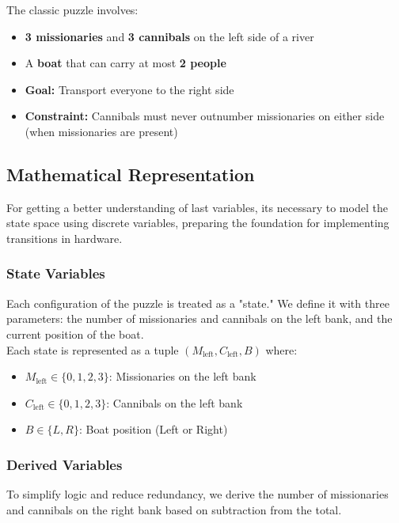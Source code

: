\documentclass[10pt,a4paper]{article}
\begin{document}
\noindent The classic puzzle involves:
\begin{itemize}
    \item \textbf{3 missionaries} and \textbf{3 cannibals} on the left side of a river
    \item A \textbf{boat} that can carry at most \textbf{2 people}
    \item \textbf{Goal:} Transport everyone to the right side
    \item \textbf{Constraint:} Cannibals must never outnumber missionaries on either side (when missionaries are present)
\end{itemize}

\subsection*{Mathematical Representation}

For getting a better understanding of last variables, its necessary to model the state space using discrete variables, preparing the foundation for implementing transitions in hardware.

\subsubsection*{State Variables}

Each configuration of the puzzle is treated as a "state." We define it with three parameters: the number of missionaries and cannibals on the left bank, and the current position of the boat.\\

\noindent Each state is represented as a tuple $(M_\text{left}, C_\text{left}, B)$ where:
\begin{itemize}
    \item $M_\text{left} \in \{0,1,2,3\}$: Missionaries on the left bank
    \item $C_\text{left} \in \{0,1,2,3\}$: Cannibals on the left bank
    \item $B \in \{L, R\}$: Boat position (Left or Right)
\end{itemize}

\subsubsection*{Derived Variables}

\noindent To simplify logic and reduce redundancy, we derive the number of missionaries and cannibals on the right bank based on subtraction from the total.
\end{document}
